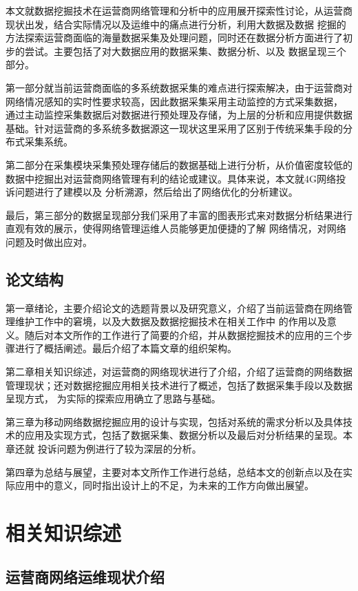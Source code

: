 \documentclass{HustGraduPaper}
\begin{document}
    本文就数据挖掘技术在运营商网络管理和分析中的应用展开探索性讨论，从运营商现状出发，结合实际情况以及运维中的痛点进行分析，利用大数据及数据
    挖掘的方法探索运营商面临的海量数据采集及处理问题，同时还在数据分析方面进行了初步的尝试。主要包括了对大数据应用的数据采集、数据分析、以及
    数据呈现三个部分。

    第一部分就当前运营商面临的多系统数据采集的难点进行探索解决，由于运营商对网络情况感知的实时性要求较高，因此数据采集采用主动监控的方式采集数据，
    通过主动监控采集数据后对数据进行预处理及存储，为上层的分析和应用提供数据基础。针对运营商的多系统多数据源这一现状这里采用了区别于传统采集手段的分布式采集系统。

    第二部分在采集模块采集预处理存储后的数据基础上进行分析，从价值密度较低的数据中挖掘出对运营商网络管理有利的结论或建议。具体来说，本文就4G网络投诉问题进行了建模以及
    分析溯源，然后给出了网络优化的分析建议。

    最后，第三部分的数据呈现部分我们采用了丰富的图表形式来对数据分析结果进行直观有效的展示，使得网络管理运维人员能够更加便捷的了解
    网络情况，对网络问题及时做出应对。

    \subsection{论文结构}

    第一章绪论，主要介绍论文的选题背景以及研究意义，介绍了当前运营商在网络管理维护工作中的窘境，以及大数据及数据挖掘技术在相关工作中
    的作用以及意义。随后对本文所作的工作进行了简要的介绍，并从数据挖掘技术的应用的三个步骤进行了概括阐述。最后介绍了本篇文章的组织架构。

    第二章相关知识综述，对运营商的网络现状进行了介绍，介绍了运营商的网络数据管理现状；还对数据挖掘应用相关技术进行了概述，包括了数据采集手段以及数据呈现方式，
    为实际的探索应用确立了思路与基础。

    第三章为移动网络数据挖掘应用的设计与实现，包括对系统的需求分析以及具体技术的应用及实现方式，包括了数据采集、数据分析以及最后对分析结果的呈现。本章还就
    投诉问题为例进行了较为深层的分析。

    第四章为总结与展望，主要对本文所作工作进行总结，总结本文的创新点以及在实际应用中的意义，同时指出设计上的不足，为未来的工作方向做出展望。

    \clearpage
    \section{相关知识综述}

    \subsection{运营商网络运维现状介绍}
\end{document}
